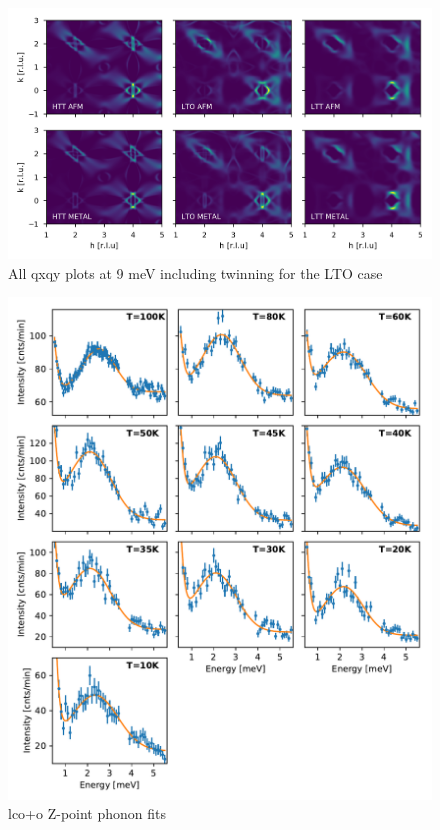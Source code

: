 \begin{figure}[]
    \centering
    \includegraphics[width=\textwidth]{fig/lowen/twinning_plots_all.png}
    \caption[All qxqy plots at 9 meV including twinning for the LTO case]{All qxqy plots at 9 meV including twinning for the LTO case}
    \label{fig:simulation_sqw_xy_plots_all}
\end{figure}

\begin{figure}
    \centering
    \includegraphics[width=\textwidth]{fig/lowen/lcoo_phonon_fits.pdf}
    \caption[lco+o Z-point phonon fits]{lco+o Z-point phonon fits}
    \label{fig:lcoo_zpoint_phonon_fits}
\end{figure}


